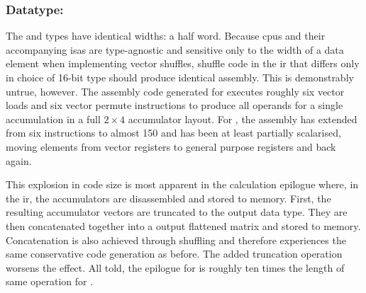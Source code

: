 \documentclass[\main/thesis.tex]{subfiles}
\begin{document}
\subsubsection{Datatype: \texorpdfstring{}{half}}
The  and  types have identical widths: a half word.
Because \glspl{cpu} and their accompanying \glspl{isa} are type-agnostic and sensitive only to the width of a data element when implementing vector shuffles, shuffle code in the \gls{ir} that differs only in choice of 16-bit type should produce identical assembly.
This is demonstrably untrue, however.
The assembly code generated for  executes roughly six vector loads and six vector permute instructions to produce all operands for a single accumulation in a full $2 \times 4$ accumulator layout.
For , the assembly has extended from six instructions to almost 150 and has been at least partially scalarised, moving elements from vector registers to general purpose registers and back again.

This explosion in code size is most apparent in the calculation epilogue where, in the \gls{ir}, the accumulators are disassembled and stored to memory.
First, the resulting accumulator vectors are truncated to the output data type.
They are then concatenated together into a output flattened matrix and stored to memory.
Concatenation is also achieved through shuffling and therefore experiences the same conservative code generation as before.
The added truncation operation worsens the effect.
All told, the epilogue for  is roughly ten times the length of same operation for .
\end{document}
